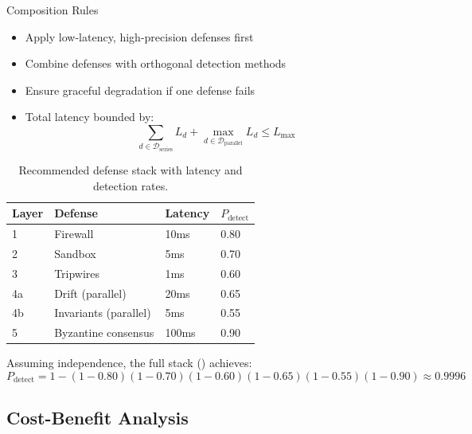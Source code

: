 \documentclass[
  ignorenonframetext,
]{beamer}
\providecommand{\cref}[1]{\texttt{\detokenize{#1}}}
\begin{document}
\begin{frame}[allowframebreaks]{Composition Rules}
\begin{itemize}
\item[\textbf{C-Order}:] Apply low-latency, high-precision defenses first
\item[\textbf{C-Diverse}:] Combine defenses with orthogonal detection methods
\item[\textbf{C-Fallback}:] Ensure graceful degradation if one defense fails
\item[\textbf{C-Budget}:] Total latency bounded by:
\begin{equation}
\label{eq:latency-budget}
\sum_{d \in \mathcal{D}_{\text{series}}} L_d + \max_{d \in \mathcal{D}_{\text{parallel}}} L_d \leq L_{\max}
\end{equation}
\end{itemize}

\begin{table}[htbp]
\centering
\caption{Recommended defense stack with latency and detection rates.}
\label{tab:defense-stack}
\begin{tabular}{@{}llll@{}}
\toprule
Layer & Defense & Latency & $P_{\text{detect}}$ \\
\midrule
1 & Firewall & 10ms & 0.80 \\
2 & Sandbox & 5ms & 0.70 \\
3 & Tripwires & 1ms & 0.60 \\
4a & Drift (parallel) & 20ms & 0.65 \\
4b & Invariants (parallel) & 5ms & 0.55 \\
5 & Byzantine consensus & 100ms & 0.90 \\
\bottomrule
\end{tabular}
\end{table}

\begin{corollary}
\label{cor:stack-detection}
Assuming independence, the full stack (\cref{tab:defense-stack}) achieves:
\begin{equation}
\label{eq:stack-detection}
P_{\text{detect}} = 1 - (1-0.80)(1-0.70)(1-0.60)(1-0.65)(1-0.55)(1-0.90) \approx 0.9996
\end{equation}
\end{corollary}
\end{frame}

\subsection{Cost-Benefit Analysis}\label{sec:cost-benefit}
\end{document}
